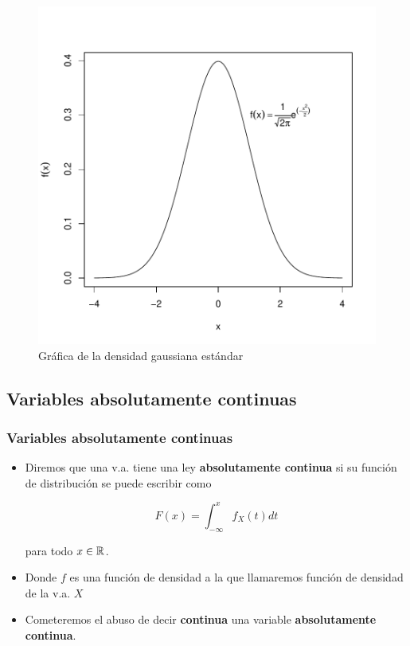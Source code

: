 \begin{frame}[fragile]
\begin{center}
\begin{figure}
\includegraphics{./dibujos/02/-006}
\caption{Gráfica de la densidad gaussiana estándar}
\end{figure}
\end{center}
\end{frame}



\subsection{Variables absolutamente continuas}

\begin{frame}
\frametitle{Variables absolutamente continuas}
\begin{itemize}
\item Diremos que una v.a. tiene una ley \textbf{absolutamente continua} si su función de distribución se puede
escribir como 

$$\displaystyle F(x)=\int_{-\infty}^x f_{X}(t) dt$$ 

para todo $x\in\mathbb{R}$.
\item  Donde $f$ es una función de densidad a la que llamaremos
función de densidad de la v.a. $X$
\item Cometeremos el abuso de decir \textbf{continua} una variable \textbf{absolutamente continua}.
\end{itemize}
\end{frame}

